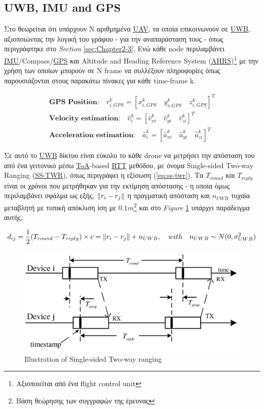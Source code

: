 

\subsection{UWB, IMU and GPS}
Στο \cite{uwb-imu-gps1} θεωρείται ότι υπάρχουν Ν αριθμημένα \hyperref[abbr:UAV]{UAV}, τα οποία επικοινωνούν σε \hyperref[abbr:UWB]{UWB}, 
αξιοποιώντας την λογική του γράφου - για την αναπαράσταση τους - όπως 
περιγράφτηκε στο \emph{Section} \ref{sec:Chapter2-3}. Ενώ κάθε node περιλαμβάνει \hyperref[abbr:IMU]{IMU}/Compass/\hyperref[abbr:GPS]{GPS} και A\-lti\-tu\-de and Heading Re\-fe\-re\-nce 
System (\hyperref[abbr:AHRS]{AHRS})\footnote{Αξιοποιείται από ένα flight control unit} με την χρήση των οποίων μπορούν σε N frame να συλλέξουν 
πληροφορίες όπως παρουσιάζονται στους πα\-ρα\-κά\-τω πίνακες για κάθε time-frame k.

\begin{gather*}
	\textbf{GPS Position:}\quad r^k_{i, GPS} = \left[x^k_{i, GPS} \quad y^k_{i, GPS} \quad z^k_{i, GPS}\right]^T \\
	\textbf{Velocity estimation:}\quad\hat{v}^k_i = \left[\hat{v}^k_{xi} \quad \hat{v}^k_{yi} \quad \hat{v}^k_{zi}\right]^T \\
	\textbf{Acceleration estimation:}\quad\hat{a}^k_i = \left[\hat{a}^k_{xi} \quad \hat{a}^k_{yi} \quad \hat{a}^k_{zi}\right]^T
\end{gather*}

Σε αυτό το \hyperref[abbr:UWB]{UWB} δίκτυο είναι εύκολο το κάθε drone να μετρήσει την απόσταση του από ένα γειτονικό
μέσω \hyperref[abbr:ToA]{ToA}-based \hyperref[abbr:RTT]{RTT} μεθόδου, με όνομα Single-sided Two-way Ranging (\hyperref[abbr:SS-TWR]{SS-TWR}),
όπως περιγράφει η εξίσωση (\ref{eq:ss-twr}). Τα $T_{round}$ και $T_{reply}$ είναι
οι χρόνοι που μετρήθηκαν για την εκτίμηση απόστασης - η οποία όμως περιλαμβάνει σφάλμα ως εξής, $\left\lVert r_i - r_j\right\rVert$ η πραγματική απόσταση και $n_{UWB}$ τυχαία μεταβλητή με τυπική απόκλιση ίση με 
$0.1m$\footnote{Βάση θεώρησης των συγγραφών της έρευνας} και στο \emph{Figure} \ref{fig:SS-TWR} υπάρχει παράδειγμα αυτής.

\begin{gather}
    d_{ij} = \frac{1}{2}(T_{round} - T_{reply}) \times c = \left\lVert r_i - r_j\right\rVert + n_{UWB}, \quad with \quad n_{UWB} \sim N(0, \sigma^2_{UWB}) \label{eq:ss-twr}
\end{gather}

\begin{figure} [H]
	\centering
	\includegraphics[width=0.69
	\linewidth]{Images/Related-Work/Single-Sided-Two-Way-Ranging-SS-TWR-5.png}
	\decoRule
	\caption[Illustration of Single-sided Two-way ranging]{Illustration of Single-sided Two-way ranging \cite{uwb-imu-gps1}}
	\label{fig:SS-TWR}
\end{figure}


